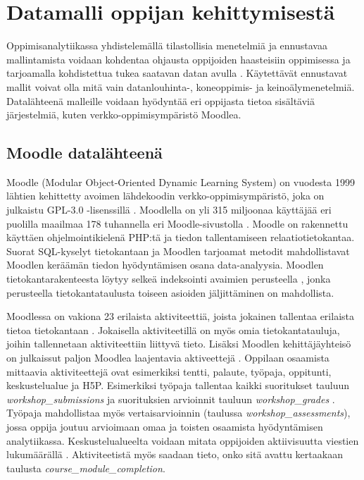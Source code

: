 \color{black}
\chapter{Datamalli oppijan kehittymisestä\label{datamallioppijankehittymisesta}}

\color{blue}
Oppimisanalytiikassa yhdistelemällä tilastollisia menetelmiä ja ennustavaa mallintamista voidaan kohdentaa ohjausta oppijoiden haasteisiin oppimisessa ja tarjoamalla kohdistettua tukea saatavan datan avulla \citep{ranjeethSurveyPredictiveModels2020}. Käytettävät ennustavat mallit voivat olla mitä vain datanlouhinta-, koneoppimis- ja keinoälymenetelmiä. Datalähteenä malleille voidaan hyödyntää eri oppijasta tietoa sisältäviä järjestelmiä, kuten verkko-oppimisympäristö Moodlea.
\color{black}

\section{Moodle datalähteenä}

Moodle (Modular Object-Oriented Dynamic Learning System) on vuodesta 1999 lähtien kehittetty avoimen lähdekoodin verkko-oppimisympäristö, joka on julkaistu GPL-3.0 -lisenssillä \citep{dougiamasPowerOpenEducational2021,dougiamasMoodle2022}. Moodlella on yli 315 miljoonaa käyttäjää eri puolilla maailmaa 178 tuhannella eri Moodle-sivustolla \citep{moodle.orgMoodleStatistics}. Moodle on rakennettu käyttäen ohjelmointikielenä PHP:tä ja tiedon tallentamiseen relaatiotietokantaa. Suorat SQL-kyselyt tietokantaan ja Moodlen tarjoamat metodit mahdollistavat Moodlen keräämän tiedon hyödyntämisen osana data-analyysia. Moodlen tietokantarakenteesta löytyy selkeä indeksointi avaimien perusteella \citep{greenMoodle11Database2022}, jonka perusteella tietokantataulusta toiseen asioiden jäljittäminen on mahdollista.

Moodlessa on vakiona 23 erilaista aktiviteettiä, joista jokainen tallentaa erilaista tietoa tietokantaan \citep{dougiamasMoodle2022}. Jokaisella aktiviteetillä on myös omia tietokantatauluja, joihin tallennetaan aktiviteettiin liittyvä tieto. Lisäksi Moodlen kehittäjäyhteisö on julkaissut paljon Moodlea laajentavia aktiveettejä \citep{moodle.orgMoodlePluginsDirectory2022}. Oppilaan osaamista mittaavia aktiviteettejä ovat esimerkiksi tentti, palaute, työpaja, oppitunti, keskustelualue ja H5P. Esimerkiksi työpaja tallentaa kaikki suoritukset tauluun \emph{workshop\_submissions} ja suorituksien arvioinnit tauluun \emph{workshop\_grades} \citep{greenMoodle11Database2022}. Työpaja mahdollistaa myös vertaisarvioinnin (taulussa \emph{workshop\_assessments}), jossa oppija joutuu arvioimaan omaa ja toisten osaamista hyödyntämisen analytiikassa. Keskustelualueelta voidaan mitata oppijoiden aktiivisuutta viestien lukumäärällä \citep{mwalumbweUsingLearningAnalytics2017}. Aktiviteetistä myös saadaan tieto, onko sitä avattu kertaakaan taulusta \emph{course\_module\_completion}.

